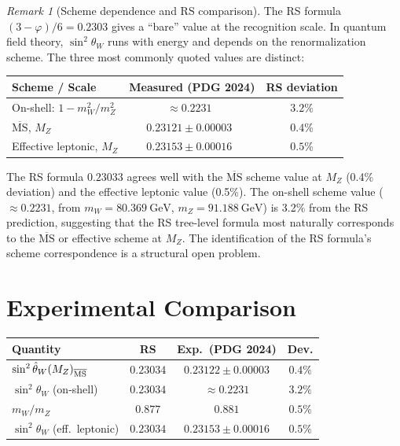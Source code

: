 \documentclass[12pt,a4paper]{article}
\theoremstyle{definition}
\theoremstyle{remark}
\newtheorem{remark}[theorem]{Remark}
\begin{document}
\begin{remark}[Scheme dependence and RS comparison]
\label{rem:scheme}
The RS formula $(3-\varphi)/6 = 0.2303$ gives a ``bare''
value at the recognition scale.  In quantum field theory,
$\sin^2\theta_W$ runs with energy and depends on the
renormalization scheme.  The three most commonly quoted values
are distinct:
\begin{center}
\renewcommand{\arraystretch}{1.2}
\begin{tabular}{lcc}
\toprule
\textbf{Scheme / Scale} & \textbf{Measured (PDG 2024)} &
\textbf{RS deviation} \\
\midrule
On-shell: $1 - m_W^2/m_Z^2$ & $\approx 0.2231$~\cite{PDG2024} & $3.2\%$ \\
$\overline{\mathrm{MS}}$, $M_Z$ & $0.23121 \pm 0.00003$~\cite{PDG2024} & $0.4\%$ \\
Effective leptonic, $M_Z$ & $0.23153 \pm 0.00016$~\cite{PDG2024} & $0.5\%$ \\
\bottomrule
\end{tabular}
\end{center}
The RS formula $0.23033$ agrees well with the
$\overline{\mathrm{MS}}$ scheme value at $M_Z$ (0.4\% deviation)
and the effective leptonic value (0.5\%).  The on-shell scheme
value ($\approx 0.2231$, from $m_W = 80.369~\mathrm{GeV}$,
$m_Z = 91.188~\mathrm{GeV}$) is 3.2\% from the RS prediction,
suggesting that the RS tree-level formula most naturally
corresponds to the $\overline{\mathrm{MS}}$ or effective
scheme at $M_Z$.  The identification of the RS formula's
scheme correspondence is a structural open problem.
\end{remark}

\section{Experimental Comparison}
\label{sec:comparison}

\begin{center}
\renewcommand{\arraystretch}{1.3}
\begin{tabular}{lccc}
\toprule
\textbf{Quantity} & \textbf{RS} &
\textbf{Exp.\ (PDG 2024)} & \textbf{Dev.} \\
\midrule
$\sin^2\hat\theta_W(M_Z)_{\overline{\rm MS}}$ & $0.23034$ & $0.23122\pm 0.00003$ & $0.4\%$ \\
$\sin^2\theta_W$ (on-shell) & $0.23034$ & $\approx 0.2231$ & $3.2\%$ \\
$m_W/m_Z$ & $0.877$ & $0.881$ & $0.5\%$ \\
$\sin^2\theta_W$ (eff.\ leptonic) & $0.23034$ & $0.23153\pm 0.00016$ & $0.5\%$ \\
\bottomrule
\end{tabular}
\end{center}
\end{document}
